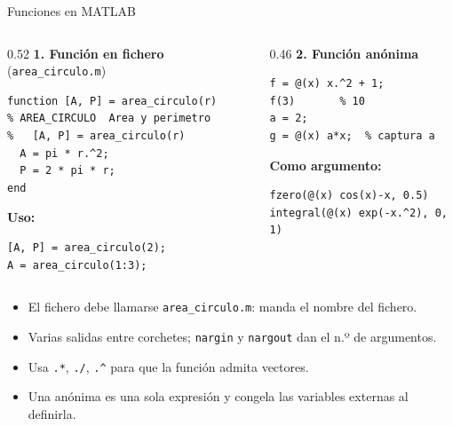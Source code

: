 \begin{frame}[fragile]{Funciones en MATLAB}



\begin{columns}[T]
  \begin{column}{0.52\textwidth}
    \textbf{1. Función en fichero} (\texttt{\small area\_circulo.m})
\begin{lstlisting}
function [A, P] = area_circulo(r)
% AREA_CIRCULO  Area y perimetro
%   [A, P] = area_circulo(r)
  A = pi * r.^2;
  P = 2 * pi * r;
end
\end{lstlisting}
    \vspace{0.4em}
    \textbf{Uso:}\vspace{-0.5em}
\begin{lstlisting}
[A, P] = area_circulo(2);
A = area_circulo(1:3);
\end{lstlisting}
  \end{column}

  \begin{column}{0.46\textwidth}
    \textbf{2. Función anónima}
\begin{lstlisting}
f = @(x) x.^2 + 1;
f(3)       % 10
a = 2;
g = @(x) a*x;  % captura a
\end{lstlisting}
    \vspace{0.4em}
    \textbf{Como argumento:}
\begin{lstlisting}
fzero(@(x) cos(x)-x, 0.5)
integral(@(x) exp(-x.^2), 0, 1)
\end{lstlisting}
  \end{column}
\end{columns}

\vspace{0.6em}
\begin{itemize}
  \item El fichero debe llamarse \texttt{area\_circulo.m}: manda el nombre del fichero.
  \item Varias salidas entre corchetes; \texttt{nargin} y \texttt{nargout} dan el n.º de argumentos.
  \item Usa \texttt{.*}, \texttt{./}, \texttt{.\^{}} para que la función admita vectores.
  \item Una anónima es una sola expresión y congela las variables externas al definirla.
\end{itemize}
\end{frame}


